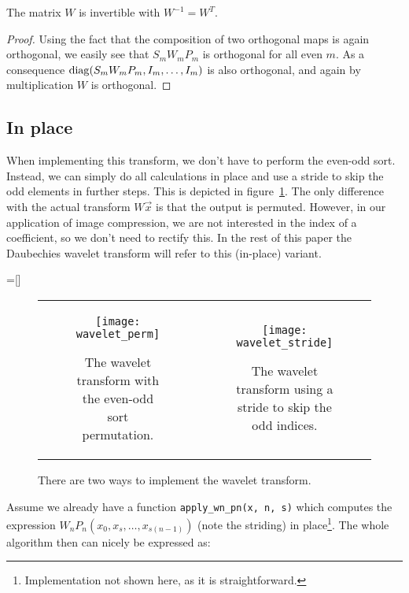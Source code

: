 \begin{theorem}
	The matrix $W$ is invertible with $W^{-1} = W^T$.
\end{theorem}
\begin{proof}
	Using the fact that the composition of two orthogonal maps is again orthogonal, we easily see that $S_m W_m P_m$ is orthogonal for all even $m$. As a consequence $\operatorname{diag}(S_m W_m P_m, I_m, \ldots, I_m)$ is also orthogonal, and again by multiplication $W$ is orthogonal.
\end{proof}


\subsection{In place}
When implementing this transform, we don't have to perform the even-odd sort. Instead, we can simply do all calculations in place and use a stride to skip the odd elements in further steps. This is depicted in figure~\ref{fig:wavelet_stride}. The only difference with the actual transform $W \vec{x}$ is that the output is permuted. However, in our application of image compression, we are not interested in the index of a coefficient, so we don't need to rectify this. In the rest of this paper the Daubechies wavelet transform will refer to this (in-place) variant.

=[]
\begin{figure}
	\begin{tabular}{c|c}
	\begin{subfigure}[b]{0.5\textwidth}
		\centering
		\texttt{[image: wavelet\_perm]}
		\caption{The wavelet transform with the even-odd sort permutation.}
	\end{subfigure}&
	\begin{subfigure}[b]{0.5\textwidth}
		\centering
		\texttt{[image: wavelet\_stride]}
		\caption{The wavelet transform using a stride to skip the odd indices.}
	\end{subfigure}
	\end{tabular}
	\caption{There are two ways to implement the wavelet transform.}
	\label{fig:wavelet_stride}
\end{figure}

Assume we already have a function \texttt{apply\_wn\_pn(x, n, s)} which computes the expression $W_n P_n (x_0, x_s, \ldots, x_{s(n-1)})$ (note the striding) in place\footnote{Implementation not shown here, as it is straightforward.}. The whole algorithm then can nicely be expressed as:

